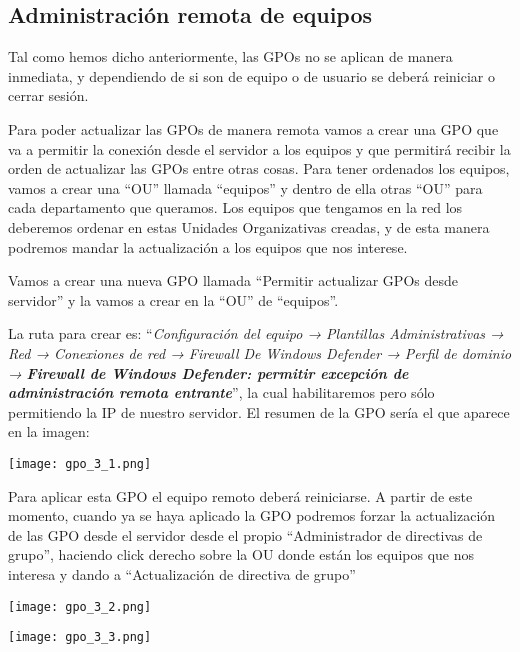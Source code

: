 \subsection{Administración remota de equipos}
Tal como hemos dicho anteriormente, las GPOs no se aplican de manera inmediata, y dependiendo de si son de equipo o de usuario se deberá reiniciar o cerrar sesión.

Para poder actualizar las GPOs de manera remota  vamos a crear una GPO que va a permitir la conexión desde el servidor a los equipos y que permitirá recibir la orden de actualizar las GPOs entre otras cosas. Para tener ordenados los equipos, vamos a crear una “OU” llamada “equipos” y dentro de ella otras “OU” para cada departamento que queramos. Los equipos que tengamos en la red los deberemos ordenar en estas Unidades Organizativas creadas, y de esta manera podremos mandar la actualización a los equipos que nos interese.

Vamos a crear una nueva GPO llamada “Permitir actualizar GPOs desde servidor” y la vamos a crear en la “OU” de “equipos”.

La ruta para crear es: “\textit{Configuración del equipo → Plantillas Administrativas → Red → Conexiones de red → Firewall De Windows Defender → Perfil de dominio → \textbf{Firewall de Windows Defender: permitir excepción de administración remota entrante}}”, la cual habilitaremos pero sólo permitiendo la IP de nuestro servidor. El resumen de la GPO sería el que aparece en la imagen:

\begin{center}
    \texttt{[image: gpo\_3\_1.png]}
\end{center}

Para aplicar esta GPO el equipo remoto deberá reiniciarse. A partir de este momento, cuando ya se haya aplicado la GPO podremos forzar la actualización de las GPO desde el servidor desde el propio “Administrador de directivas de grupo”, haciendo click derecho sobre la OU donde están los equipos que nos interesa y dando a “Actualización de directiva de grupo”

{
    \begin{minipage}{0.48\linewidth}
        \texttt{[image: gpo\_3\_2.png]}
    \end{minipage}
    \hfill
    \begin{minipage}{0.48\linewidth}
        \texttt{[image: gpo\_3\_3.png]}
    \end{minipage}
}

